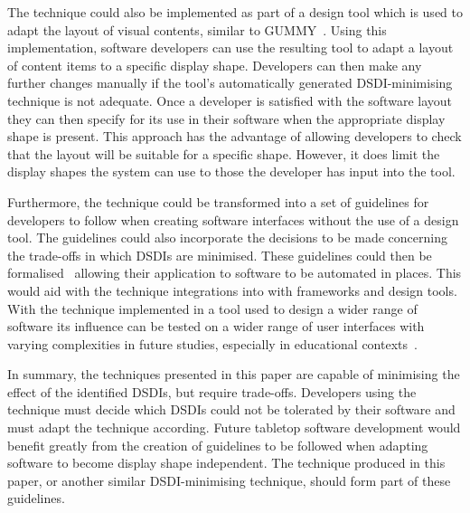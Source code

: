 \documentclass{bmcart}
\begin{document}
The technique could also be implemented as part of a design tool which is used to adapt the layout of visual contents, similar to GUMMY~\cite{Meskens2008}.
Using this implementation, software developers can use the resulting tool to adapt a layout of content items to a specific display shape.
Developers can then make any further changes manually if the tool's automatically generated \ac{DSDI}-minimising technique is not adequate.
Once a developer is satisfied with the software layout they can then specify for its use in their software when the appropriate display shape is present.
This approach has the advantage of allowing developers to check that the layout will be suitable for a specific shape.
However, it does limit the display shapes the system can use to those the developer has input into the tool.

Furthermore, the technique could be transformed into a set of guidelines for developers to follow when creating software interfaces without the use of a design tool.
The guidelines could also incorporate the decisions to be made concerning the trade-offs in which \acp{DSDI} are minimised.
These guidelines could then be formalised~\cite{Ngo2000} allowing their application to software to be automated in places.
This would aid with the technique integrations into with frameworks and design tools.
With the technique implemented in a tool used to design a wider range of software its influence can be tested on a wider range of user interfaces with varying complexities in future studies, especially in educational contexts~\cite{McNaughton2017,jg-et-al:2017}.

In summary, the techniques presented in this paper are capable of minimising the effect of the identified \acp{DSDI}, but require trade-offs.
Developers using the technique must decide which \acp{DSDI} could not be tolerated by their software and must adapt the technique according.
Future tabletop software development would benefit greatly from the creation of guidelines to be followed when adapting software to become display shape independent.
The technique produced in this paper, or another similar \ac{DSDI}-minimising technique, should form part of these guidelines.


\end{document}
